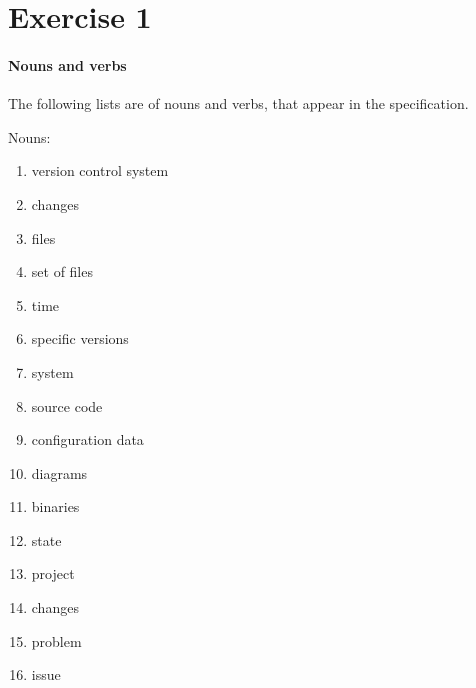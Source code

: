 \section{Exercise 1}
\paragraph{Nouns and verbs}
The following lists are of nouns and verbs, that appear in the specification.

Nouns:
\begin{enumerate}
	\item version control system
	\item changes
	\item files
	\item set of files
	\item time
	\item specific versions
	\item system
	\item source code
	\item configuration data
	\item diagrams
	\item binaries
	\item state
	\item project
	\item changes
	\item problem
	\item issue
\end{enumerate}

